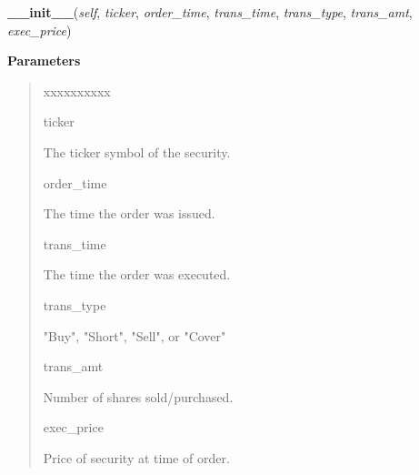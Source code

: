 \hspace{.8\funcindent}\begin{boxedminipage}{\funcwidth}

    \raggedright \textbf{\_\_init\_\_}(\textit{self}, \textit{ticker}, \textit{order\_time}, \textit{trans\_time}, \textit{trans\_type}, \textit{trans\_amt}, \textit{exec\_price})

\setlength{\parskip}{2ex}
\setlength{\parskip}{1ex}
      \textbf{Parameters}
      \vspace{-1ex}

      \begin{quote}
        \begin{Ventry}{xxxxxxxxxx}

          \item[ticker]

          The ticker symbol of the security.

          \item[order\_time]

          The time the order was issued.

          \item[trans\_time]

          The time the order was executed.

          \item[trans\_type]

          "Buy", "Short", "Sell", or "Cover"

          \item[trans\_amt]

          Number of shares sold/purchased.

          \item[exec\_price]

          Price of security at time of order.

        \end{Ventry}

      \end{quote}

    \end{boxedminipage}

